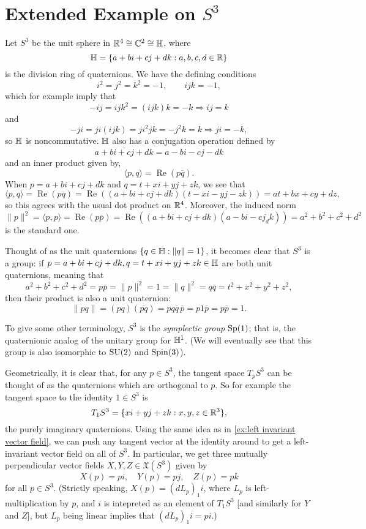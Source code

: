 
\section{Extended Example on $S^3$}

Let $S^3$ be the unit sphere in $\mathbb{R}^4 \cong \mathbb{C}^2 \cong \mathbb{H}$, where 
\[
	\mathbb{H} = \{ a + bi + cj + dk : a,b,c,d\in \mathbb{R}\}
\]
is the division ring of quaternions. We have the defining conditions
\[
	i^2=j^2=k^2 = -1, \qquad ijk = -1,
\]
which for example imply that 
\[
	-ij = ijk^2 = (ijk)k = -k \Rightarrow ij=k
\]
and
\[
	-ji = ji(ijk) = ji^2jk = -j^2k = k \Rightarrow ji = -k,
\]
so $\mathbb{H}$ is noncommutative. $\mathbb{H}$ also has a conjugation operation defined by 
\[
	\overline{a+bi+cj+dk} = a-bi-cj-dk
\]
and an inner product given by,
\[
	\langle p,q \rangle = \operatorname{Re}(p\overline{q}).
\]
When $p = a+bi+cj+dk$ and $q = t + xi + yj + zk$, we see that
\[
	\langle p , q \rangle = \operatorname{Re}(p\overline{q}) = \operatorname{Re}((a+bi+cj+dk)(t-xi-yj-zk)) = at+bx+cy+dz,
\]
so this agrees with the usual dot product on $\mathbb{R}^4$. Moreover, the induced norm
\[
	\|p\|^2 = \langle p, p\rangle = \operatorname{Re}(p \overline{p}) = \operatorname{Re}((a+bi+cj+dk) (a-bi-cj_dk)) = a^2 + b^2 + c^2 + d^2
\]
is the standard one.

Thought of as the unit quaternions $\{q \in \mathbb{H} : \|q\| = 1\}$, it becomes clear that $S^3$ is a group: if $p = a+bi+cj+dk , q = t + xi + yj + zk \in \mathbb{H}$ are both unit quaternions, meaning that
\[
	a^2 + b^2 + c^2 + d^2 = p \overline{p} = \|p\|^2 = 1 = \|q\|^2 = q \overline{q} = t^2 + x^2 + y^2 + z^2,
\]
then their product is also a unit quaternion:
\[
	\|pq\| = (pq)(\overline{pq}) = p q \overline{q}\, \overline{p} = p 1 \overline{p} = p \overline{p} = 1.
\]

To give some other terminology, $S^3$ is the \emph{symplectic group} $\operatorname{Sp}(1)$; that is, the quaternionic analog of the unitary group for $\mathbb{H}^1$. (We will eventually see that this group is also isomorphic to $\operatorname{SU}(2)$ and $\operatorname{Spin}(3)$).

Geometrically, it is clear that, for any $p \in S^3$, the tangent space $T_pS^3$ can be thought of as the quaternions which are orthogonal to $p$. So for example the tangent space to the identity $1 \in S^3$ is
\[
	T_1 S^3 = \{xi + yj + zk : x,y,z \in \mathbb{R}^3\},
\]
the purely imaginary quaternions. Using the same idea as in \cref{ex:left invariant vector field}, we can push any tangent vector at the identity around to get a left-invariant vector field on all of $S^3$. In particular, we get three mutually perpendicular vector fields $X,Y,Z \in \mathfrak{X}(S^3)$ given by
\[
	X(p) = pi, \quad Y(p) = pj, \quad Z(p) = pk
\]
for all $p \in S^3$. (Strictly speaking, $X(p) = (d L_p)_1 i$, where $L_p$ is left-multiplication by $p$, and $i$ is intepreted as an element of $T_1S^3$ [and similarly for $Y$ and $Z$], but $L_p$ being linear implies that $(dL_p)_1 i = pi$.)

